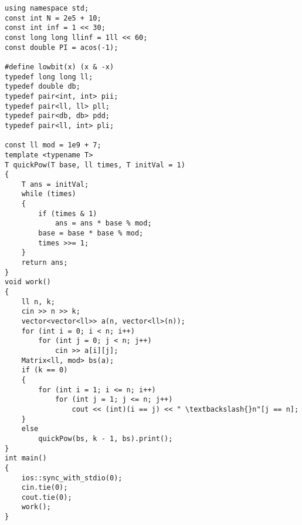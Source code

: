 \documentclass{ctexbook}  %
\begin{document}
\begin{Verbatim}[fontsize=\small]
using namespace std;
const int N = 2e5 + 10;
const int inf = 1 << 30;
const long long llinf = 1ll << 60;
const double PI = acos(-1);

#define lowbit(x) (x & -x)
typedef long long ll;
typedef double db;
typedef pair<int, int> pii;
typedef pair<ll, ll> pll;
typedef pair<db, db> pdd;
typedef pair<ll, int> pli;

const ll mod = 1e9 + 7;
template <typename T>
T quickPow(T base, ll times, T initVal = 1)
{
    T ans = initVal;
    while (times)
    {
        if (times & 1)
            ans = ans * base % mod;
        base = base * base % mod;
        times >>= 1;
    }
    return ans;
}
void work()
{
    ll n, k;
    cin >> n >> k;
    vector<vector<ll>> a(n, vector<ll>(n));
    for (int i = 0; i < n; i++)
        for (int j = 0; j < n; j++)
            cin >> a[i][j];
    Matrix<ll, mod> bs(a);
    if (k == 0)
    {
        for (int i = 1; i <= n; i++)
            for (int j = 1; j <= n; j++)
                cout << (int)(i == j) << " \textbackslash{}n"[j == n];
    }
    else
        quickPow(bs, k - 1, bs).print();
}
int main()
{
    ios::sync_with_stdio(0);
    cin.tie(0);
    cout.tie(0);
    work();
}
\end{Verbatim}
\end{document}
